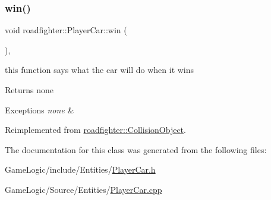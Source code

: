 \subsubsection{\texorpdfstring{win()}{win()}}
{\footnotesize\ttfamily void roadfighter\+::\+Player\+Car\+::win (\begin{DoxyParamCaption}{ }\end{DoxyParamCaption})\hspace{0.3cm}{\ttfamily [override]}, {\ttfamily [virtual]}}

this function says what the car will do when it wins \begin{DoxyReturn}{Returns}
none 
\end{DoxyReturn}

\begin{DoxyExceptions}{Exceptions}
{\em none} & \\
\hline
\end{DoxyExceptions}


Reimplemented from \hyperlink{classroadfighter_1_1CollisionObject_aa793e1b9943ee90bbb4129ddd06b9be7}{roadfighter\+::\+Collision\+Object}.



The documentation for this class was generated from the following files\+:\begin{DoxyCompactItemize}
\item 
Game\+Logic/include/\+Entities/\hyperlink{PlayerCar_8h}{Player\+Car.\+h}\item 
Game\+Logic/\+Source/\+Entities/\hyperlink{PlayerCar_8cpp}{Player\+Car.\+cpp}\end{DoxyCompactItemize}
